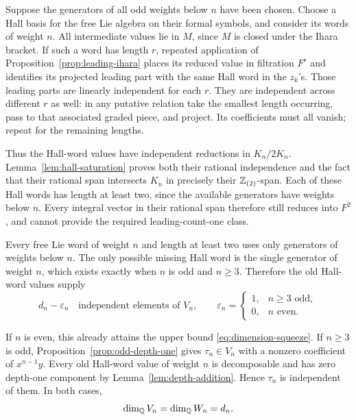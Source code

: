 Suppose the generators of all odd weights below \(n\) have been
chosen.  Choose a Hall basis for the free Lie algebra on their
formal symbols, and consider its words of weight \(n\).
All intermediate values lie in \(M\), since \(M\) is closed under
the Ihara bracket.
If such a word has length \(r\), repeated application of
Proposition~\ref{prop:leading-ihara} places its reduced value in
filtration \(F^r\) and identifies its projected leading part with
the same Hall word in the \(z_k\)'s.
Those leading parts are linearly independent for each \(r\).
They are independent across different \(r\) as well: in any
putative relation take the smallest length occurring, pass to
that associated graded piece, and project.  Its coefficients
must all vanish; repeat for the remaining lengths.

Thus the Hall-word values have independent reductions in
\(K_n/2K_n\).  Lemma~\ref{lem:hall-saturation} proves both their
rational independence and the fact that their rational span
intersects \(K_n\) in precisely their \(\mathbb Z_{(2)}\)-span.
Each of these Hall words has length at least two, since the
available generators have weights below \(n\).  Every integral
vector in their rational span therefore still reduces into
\(F^2\), and cannot provide the required leading-count-one class.

Every free Lie word of weight \(n\) and length at least two uses
only generators of weights below \(n\).  The only possible
missing Hall word is the single generator of weight \(n\), which
exists exactly when \(n\) is odd and \(n\ge3\).  Therefore the old
Hall-word values supply
\[
 d_n-\varepsilon_n
 \quad\text{independent elements of }V_n,\qquad
 \varepsilon_n=
 \begin{cases}
  1,&n\ge3\text{ odd},\\
  0,&n\text{ even}.
 \end{cases}
\]

If \(n\) is even, this already attains the upper bound
\eqref{eq:dimension-squeeze}.  If \(n\ge3\) is odd,
Proposition~\ref{prop:odd-depth-one} gives
\(\tau_n\in V_n\) with a nonzero coefficient of \(x^{n-1}y\).
Every old Hall-word value of weight \(n\) is decomposable and
has zero depth-one component by Lemma~\ref{lem:depth-addition}.
Hence \(\tau_n\) is independent of them.  In both cases,
\begin{equation}\label{eq:dimension-equality}
 \dim_\mathbb Q V_n=\dim_\mathbb Q W_n=d_n.
\end{equation}


